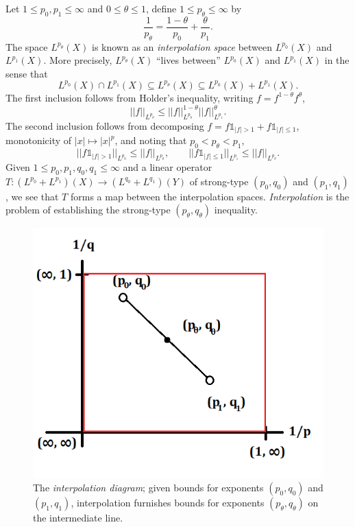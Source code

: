 \documentclass[reqno]{amsart}
\theoremstyle{definition}
\theoremstyle{remark}
\begin{document}
Let $1 \leq p_0, p_1 \leq \infty$ and $0 \leq \theta \leq 1$, define $1 \leq p_\theta \leq \infty$ by 
	\[ \frac{1}{p_\theta} = \frac{1 - \theta}{p_0} + \frac{\theta}{p_1}. \]
The space $L^{p_\theta} (X)$ is known as an \textit{interpolation space} between $L^{p_0} (X)$ and $L^{p_1} (X)$. More precisely, $L^{p_\theta} (X)$ ``lives between'' $L^{p_0} (X)$ and $L^{p_1} (X)$ in the sense that 
	\[ L^{p_0} (X) \cap L^{p_1} (X) \subseteq L^{p_\theta} (X) \subseteq L^{p_0} (X) + L^{p_1} (X).\]
The first inclusion follows from Holder's inequality, writing $f = f^{1 - \theta} f^\theta$, 
		\[ ||f||_{L^{p_\theta}} \leq ||f||_{L^{p_0}}^{1 - \theta} ||f||_{L^{p_1}}^\theta.\]
	The second inclusion follows from decomposing $f = f \mathbb 1_{|f| > 1} + f \mathbb 1_{|f| \leq 1}$, monotonicity of $|x| \mapsto |x|^p$, and noting that $p_0 < p_\theta < p_1$, 
		\[ ||f \mathbb 1_{|f| > 1}||_{L^{p_0}} \leq || f||_{L^{p_\theta}} , \qquad  ||f \mathbb 1_{|f| \leq 1}||_{L^{p_1}} \leq || f||_{L^{p_\theta}}. \]	
Given $1 \leq p_0, p_1, q_0, q_1 \leq \infty$ and a linear operator $T: (L^{p_0} + L^{p_1}) (X) \to (L^{q_0} + L^{q_1}) (Y)$ of strong-type $(p_0, q_0)$ and $(p_1, q_1)$, we see that $T$ forms a map between the interpolation spaces. \textit{Interpolation} is the problem of establishing the strong-type $(p_\theta, q_\theta)$ inequality. 

\begin{figure}[h]
	\begin{center}
		\includegraphics[scale = 0.6]{realinter}
		\caption{The \textit{interpolation diagram}; given bounds for exponents $(p_0, q_0)$ and $(p_1, q_1)$, interpolation furnishes bounds for exponents $(p_\theta, q_\theta)$ on the intermediate line.}
	\end{center}
\end{figure}
\end{document}
